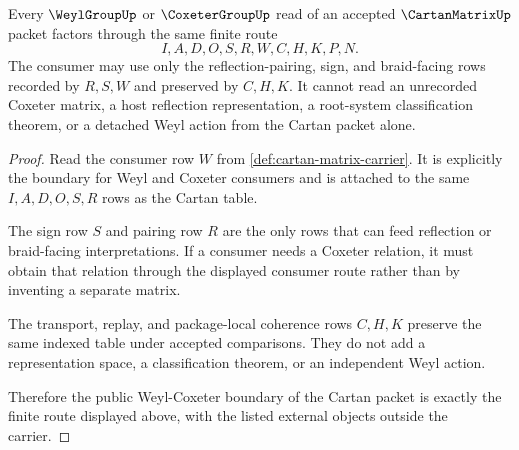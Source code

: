 \begin{theorem}
\label{thm:cartan-matrix-weyl-coxeter-boundary}
Every $\WeylGroupUp$ or $\CoxeterGroupUp$ read of an accepted $\CartanMatrixUp$ packet factors through the same finite route
$$
I,A,D,O,S,R,W,C,H,K,P,N .
$$
The consumer may use only the reflection-pairing, sign, and braid-facing rows recorded by $R,S,W$ and preserved by $C,H,K$. It cannot read an unrecorded Coxeter matrix, a host reflection representation, a root-system classification theorem, or a detached Weyl action from the Cartan packet alone.
\end{theorem}
\begin{proof}
Read the consumer row $W$ from \autoref{def:cartan-matrix-carrier}. It is explicitly the boundary for Weyl and Coxeter consumers and is attached to the same $I,A,D,O,S,R$ rows as the Cartan table.

The sign row $S$ and pairing row $R$ are the only rows that can feed reflection or braid-facing interpretations. If a consumer needs a Coxeter relation, it must obtain that relation through the displayed consumer route rather than by inventing a separate matrix.

The transport, replay, and package-local coherence rows $C,H,K$ preserve the same indexed table under accepted comparisons. They do not add a representation space, a classification theorem, or an independent Weyl action.

Therefore the public Weyl-Coxeter boundary of the Cartan packet is exactly the finite route displayed above, with the listed external objects outside the carrier.
\end{proof}


\begin{closurestatus}{\CartanMatrixUp}
  \theoryclosure{\seedClosure}
  \formalstatus{\unformalizedV}
\end{closurestatus}
